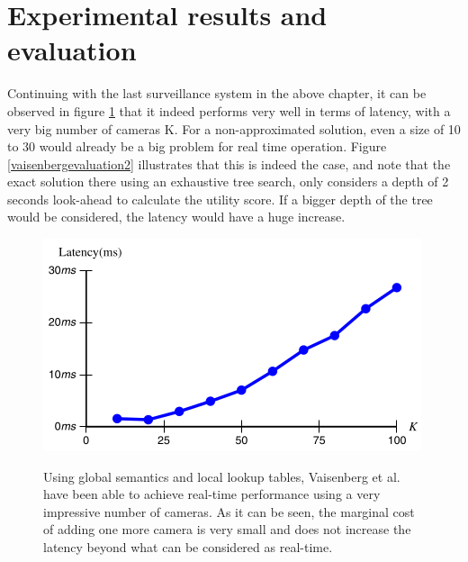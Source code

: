 \documentclass[12pt,twoside]{article}
\theoremstyle{plain}
\theoremstyle{definition}
\theoremstyle{remark}
\begin{document}
\section{Experimental results and evaluation}
Continuing with the last surveillance system in the above chapter, it can be observed in figure \ref{vaisenbergevaluation1} that it indeed performs very well in terms of latency, with a very big number of cameras K. For a non-approximated solution, even a size of 10 to 30 would already be a big problem for real time operation. Figure \ref{vaisenbergevaluation2} illustrates that this is indeed the case, and note that the exact solution there using an exhaustive tree search, only considers a depth of 2 seconds look-ahead to calculate the utility score. If a bigger depth of the tree would be considered, the latency would have a huge increase.
\begin{figure}[H]
  \caption{Using global semantics and local lookup tables, Vaisenberg et al. \cite{vaisenberg2014scheduling} have been able to achieve real-time performance using a very impressive number of cameras. As it can be seen, the marginal cost of adding one more camera is very small and does not increase the latency beyond what can be considered as real-time.}
  \centering
    \includegraphics[scale=0.7]{vaisenbergevaluation1.png}
  \label{vaisenbergevaluation1}
\end{figure}
\end{document}
